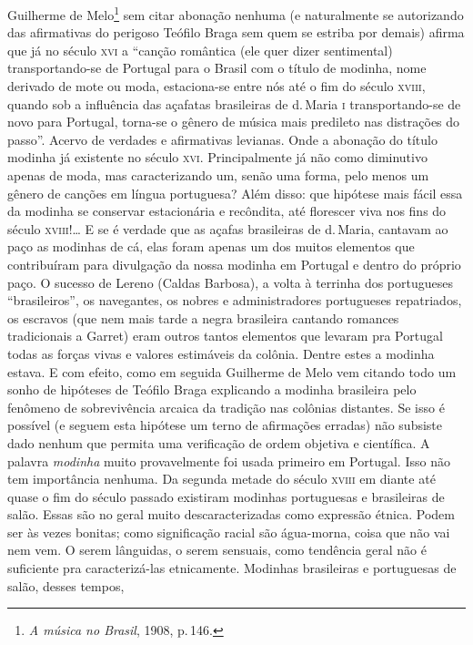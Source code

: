 Guilherme de Melo\footnote{\textit{A música no Brasil}, 1908, p.\,146.} sem citar abonação
nenhuma (e naturalmente se autorizando das afirmativas do perigoso
Teófilo Braga sem quem se estriba por demais) afirma que já no século \textsc{xvi}
a ``canção romântica (ele quer dizer sentimental) transportando-se de
Portugal para o Brasil com o título de modinha, nome derivado de mote ou
moda, estaciona-se entre nós até o fim do século \textsc{xviii}, quando sob a
influência das açafatas brasileiras de d.\,Maria \textsc{i} transportando-se de
novo para Portugal, torna-se o gênero de música mais predileto nas
distrações do passo''. Acervo de verdades e afirmativas levianas. Onde a
abonação do título modinha já existente no século \textsc{xvi}. Principalmente já
não como diminutivo apenas de moda, mas caracterizando um, senão uma
forma, pelo menos um gênero de canções em língua portuguesa? Além disso:
que hipótese mais fácil essa da modinha se conservar estacionária e
recôndita, até florescer viva nos fins do século \textsc{xviii}!\ldots{} E se é verdade
que as açafas brasileiras de d.\,Maria, cantavam ao paço as modinhas de
cá, elas foram apenas um dos muitos elementos que contribuíram para
divulgação da nossa modinha em Portugal e dentro do próprio paço. O
sucesso de Lereno (Caldas Barbosa), a volta à terrinha dos portugueses
``brasileiros'', os navegantes, os nobres e administradores portugueses
repatriados, os escravos (que nem mais tarde a negra brasileira cantando
romances tradicionais a Garret) eram outros tantos elementos que levaram
pra Portugal todas as forças vivas e valores estimáveis da colônia.
Dentre estes a modinha estava. E com efeito, como em seguida Guilherme
de Melo vem citando todo um sonho de hipóteses de Teófilo Braga
explicando a modinha brasileira pelo fenômeno de sobrevivência arcaica
da tradição nas colônias distantes. Se isso é possível (e seguem esta
hipótese um terno de afirmações erradas) não subsiste dado nenhum que
permita uma verificação de ordem objetiva e científica. A palavra
\textit{modinha} muito provavelmente foi usada primeiro em Portugal. Isso não
tem importância nenhuma. Da segunda metade do século \textsc{xviii} em diante até
quase o fim do século passado existiram modinhas portuguesas e
brasileiras de salão. Essas são no geral muito descaracterizadas como
expressão étnica. Podem ser às vezes bonitas; como significação racial
são água-morna, coisa que não vai nem vem. O serem lânguidas, o serem
sensuais, como tendência geral não é suficiente pra caracterizá-las
etnicamente. Modinhas brasileiras e portuguesas de salão, desses tempos,
